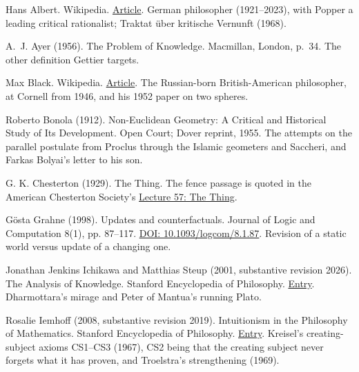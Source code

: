 \documentclass[11pt,twoside]{article}
\theoremstyle{thielethm}
\theoremstyle{thieledef}
\theoremstyle{thieledef}
\theoremstyle{thieledef}
\theoremstyle{thielethm}
\theoremstyle{thieleobs}
\theoremstyle{thielethm}
\begin{document}
\noindent Hans Albert. Wikipedia. \href{https://en.wikipedia.org/wiki/Hans_Albert}{Article}. German philosopher (1921--2023), with Popper a leading critical rationalist; Traktat über kritische Vernunft (1968).
\par\medskip

\noindent A.~J. Ayer (1956). The Problem of Knowledge. Macmillan, London, p.~34. The other definition Gettier targets.
\par\medskip

\noindent Max Black. Wikipedia. \href{https://en.wikipedia.org/wiki/Max_Black}{Article}. The Russian-born British-American philosopher, at Cornell from 1946, and his 1952 paper on two spheres.
\par\medskip

\noindent Roberto Bonola (1912). Non-Euclidean Geometry: A Critical and Historical Study of Its Development. Open Court; Dover reprint, 1955. The attempts on the parallel postulate from Proclus through the Islamic geometers and Saccheri, and Farkas Bolyai's letter to his son.
\par\medskip

\noindent G. K. Chesterton (1929). The Thing. The fence passage is quoted in the American Chesterton Society's \href{https://www.chesterton.org/lecture-57/}{Lecture 57: The Thing}.
\par\medskip

\noindent G\"osta Grahne (1998). Updates and counterfactuals. Journal of Logic and Computation 8(1), pp. 87--117. \href{https://doi.org/10.1093/logcom/8.1.87}{DOI: 10.1093/logcom/8.1.87}. Revision of a static world versus update of a changing one.
\par\medskip

\noindent Jonathan Jenkins Ichikawa and Matthias Steup (2001, substantive revision 2026). The Analysis of Knowledge. Stanford Encyclopedia of Philosophy. \href{https://plato.stanford.edu/entries/knowledge-analysis/}{Entry}. Dharmottara's mirage and Peter of Mantua's running Plato.
\par\medskip

\noindent Rosalie Iemhoff (2008, substantive revision 2019). Intuitionism in the Philosophy of Mathematics. Stanford Encyclopedia of Philosophy. \href{https://plato.stanford.edu/entries/intuitionism/}{Entry}. Kreisel's creating-subject axioms CS1--CS3 (1967), CS2 being that the creating subject never forgets what it has proven, and Troelstra's strengthening (1969).
\par\medskip
\end{document}
